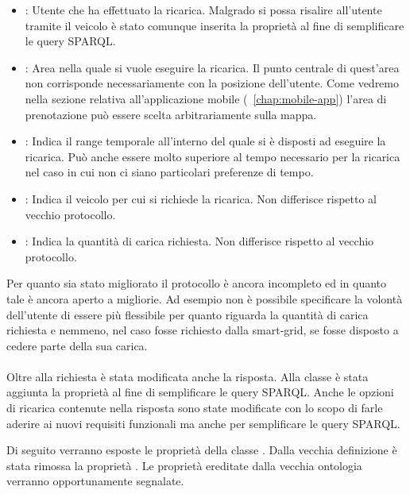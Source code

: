 \begin{itemize}
	\item {}: Utente che ha effettuato la ricarica. Malgrado si possa risalire all'utente tramite il veicolo è stato comunque inserita la proprietà al fine di semplificare le query SPARQL.
	\item {}: Area nella quale si vuole eseguire la ricarica. Il punto centrale di quest'area non corrisponde necessariamente con la posizione dell'utente. Come vedremo nella sezione relativa all'applicazione mobile (~\ref{chap:mobile-app}) l'area di prenotazione può essere scelta arbitrariamente sulla mappa.
	\item {}: Indica il range temporale all'interno del quale si è disposti ad eseguire la ricarica. Può anche essere molto superiore al tempo necessario per la ricarica nel caso in cui non ci siano particolari preferenze di tempo.
	\item {}: Indica il veicolo per cui si richiede la ricarica. Non differisce rispetto al vecchio protocollo.
	\item {}: Indica la quantità di carica richiesta. Non differisce rispetto al vecchio protocollo.
\end{itemize}

\noindent
Per quanto sia stato migliorato il protocollo è ancora incompleto ed in quanto tale è ancora aperto a migliorie. Ad esempio non è possibile specificare la volontà dell'utente di essere più flessibile per quanto riguarda la quantità di carica richiesta e nemmeno, nel caso fosse richiesto dalla smart-grid, se fosse disposto a cedere parte della sua carica.
\\ \\
Oltre alla richiesta è stata modificata anche la risposta. Alla classe  è stata aggiunta la proprietà  al fine di semplificare le query SPARQL.
Anche le opzioni di ricarica contenute nella risposta sono state modificate con lo scopo di farle aderire ai nuovi requisiti funzionali ma anche per semplificare le query SPARQL.

Di seguito verranno esposte le proprietà della classe . Dalla vecchia definizione è stata rimossa la proprietà . Le proprietà ereditate dalla vecchia ontologia verranno opportunamente segnalate.

